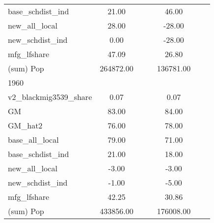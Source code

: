 \begin{table}[htbp]
\begin{tabular}{l*{2}{ccc}}
base\_schdist\_ind    &       21.00&            &            &       46.00&            &            \\
new\_all\_local       &       28.00&            &            &      -28.00&            &            \\
new\_schdist\_ind     &        0.00&            &            &      -28.00&            &            \\
mfg\_lfshare         &       47.09&            &            &       26.80&            &            \\
(sum) Pop           &   264872.00&            &            &   136781.00&            &            \\
\midrule
1960                &            &            &            &            &            &            \\
v2\_blackmig3539\_share&        0.07&            &            &        0.07&            &            \\
GM                  &       83.00&            &            &       84.00&            &            \\
GM\_hat2             &       76.00&            &            &       78.00&            &            \\
base\_all\_local      &       79.00&            &            &       71.00&            &            \\
base\_schdist\_ind    &       21.00&            &            &       18.00&            &            \\
new\_all\_local       &       -3.00&            &            &       -3.00&            &            \\
new\_schdist\_ind     &       -1.00&            &            &       -5.00&            &            \\
mfg\_lfshare         &       42.25&            &            &       30.86&            &            \\
(sum) Pop           &   433856.00&            &            &   176008.00&            &            \\
\bottomrule
\end{tabular}
\end{table}
